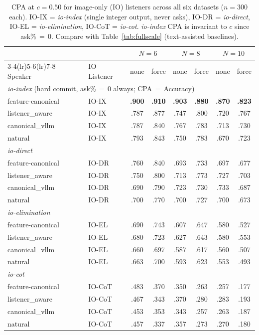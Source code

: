 \documentclass[11pt]{article}
\begin{document}
\begin{table}[ht]
\centering
\small
\setlength{\tabcolsep}{4pt}
\begin{tabular}{llcccccc}
\toprule
 & & \multicolumn{2}{c}{$N{=}6$} & \multicolumn{2}{c}{$N{=}8$} &
     \multicolumn{2}{c}{$N{=}10$} \\
\cmidrule(lr){3-4}\cmidrule(lr){5-6}\cmidrule(lr){7-8}
Speaker & IO Listener & none & force & none & force & none & force \\
\midrule
\multicolumn{8}{l}{\textit{io-index} \textnormal{(hard commit, ask\%\,$=$\,0 always; CPA\,$=$\,Accuracy)}} \\
feature-canonical   & IO-IX & \textbf{.900} & \textbf{.910} & \textbf{.903} & \textbf{.880} & \textbf{.870} & \textbf{.823} \\
listener\_aware     & IO-IX & .787 & .877 & .747 & .800 & .720 & .767 \\
canonical\_vllm     & IO-IX & .787 & .840 & .767 & .783 & .713 & .730 \\
natural             & IO-IX & .793 & .843 & .750 & .783 & .670 & .723 \\
\midrule
\multicolumn{8}{l}{\textit{io-direct}} \\
feature-canonical   & IO-DR & .760 & .840 & .693 & .733 & .697 & .677 \\
listener\_aware     & IO-DR & .750 & .800 & .713 & .773 & .727 & .703 \\
canonical\_vllm     & IO-DR & .690 & .790 & .723 & .730 & .733 & .687 \\
natural             & IO-DR & .700 & .770 & .700 & .727 & .700 & .673 \\
\midrule
\multicolumn{8}{l}{\textit{io-elimination}} \\
feature-canonical   & IO-EL & .690 & .743 & .607 & .647 & .580 & .527 \\
listener\_aware     & IO-EL & .680 & .723 & .627 & .643 & .580 & .553 \\
canonical\_vllm     & IO-EL & .660 & .697 & .587 & .617 & .560 & .507 \\
natural             & IO-EL & .663 & .700 & .593 & .623 & .553 & .493 \\
\midrule
\multicolumn{8}{l}{\textit{io-cot}} \\
feature-canonical   & IO-CoT & .483 & .370 & .350 & .263 & .257 & .177 \\
listener\_aware     & IO-CoT & .467 & .343 & .370 & .280 & .283 & .193 \\
canonical\_vllm     & IO-CoT & .453 & .353 & .343 & .257 & .263 & .187 \\
natural             & IO-CoT & .457 & .337 & .357 & .273 & .270 & .180 \\
\bottomrule
\end{tabular}
\caption{CPA at $c{=}0.50$ for image-only (IO) listeners across all six datasets
         ($n{=}300$ each).
         IO-IX = \textit{io-index} (single integer output, never asks),
         IO-DR = \textit{io-direct}, IO-EL = \textit{io-elimination},
         IO-CoT = \textit{io-cot}.
         \textit{io-index} CPA is invariant to $c$ since ask\%\,$=$\,0.
         Compare with Table~\ref{tab:fullscale} (text-assisted baselines).}
\label{tab:io-c05}
\end{table}
\end{document}
